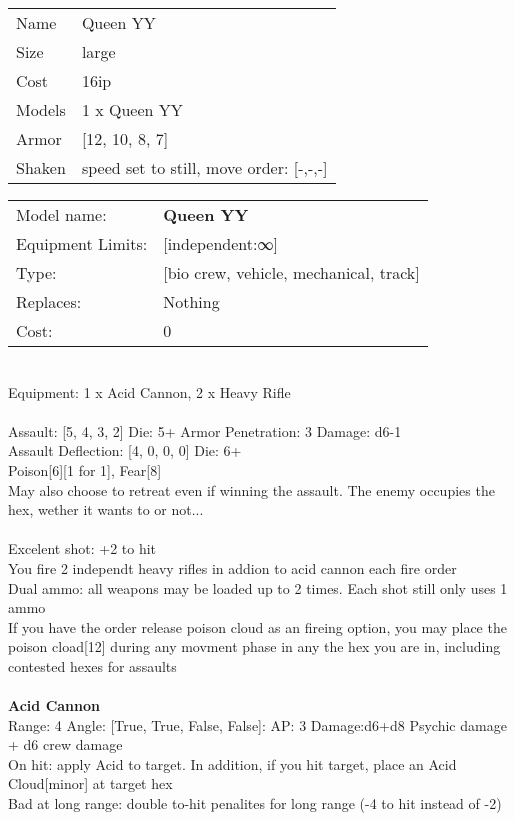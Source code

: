 \begin{tabular}{ll}
  Name & Queen YY \\
  Size & large\\
  Cost & 16ip\\
  Models & 1 x Queen YY\\
  Armor & [12, 10, 8, 7]\\
  Shaken & speed set to still, move order: [-,-,-]\\
\end{tabular}

\noindent 

\noindent
\begin{tabular}{ll}
Model name: &{\bf Queen YY } \\
Equipment Limits: &[independent:∞] \\
Type: &[bio crew, vehicle, mechanical, track] \\
Replaces: &Nothing \\
Cost: & 0\\
\end{tabular}
\ \\
Equipment: 1 x Acid Cannon, 2 x Heavy Rifle \\
\ \\
Assault: [5, 4, 3, 2] Die: 5+ Armor Penetration: 3 Damage: d6-1 \\
Assault Deflection: [4, 0, 0, 0] Die: 6+\\
\indent Poison[6][1 for 1], Fear[8]\\ 
May also choose to retreat even if winning the assault. The enemy occupies the hex, wether it wants to or not...\\ 
 
\ \\
Excelent shot: +2 to hit\\ 
You fire 2 independt heavy rifles in addion to acid cannon each fire order\\ 
Dual ammo: all weapons may be loaded up to 2 times. Each shot still only uses 1 ammo\\ 
If you have the order release poison cloud as an fireing option, you may place the poison cload[12] during any movment phase in any the hex you are in, including contested hexes for assaults\\ 

\ \\
{\bf Acid Cannon } \\



Range: 4  Angle: [True, True, False, False]: AP: 3 Damage:d6+d8 Psychic damage + d6 crew damage \\
On hit: apply Acid to target. In addition, if you hit target, place an Acid Cloud[minor] at target hex\\ 
Bad at long range: double to-hit penalites for long range (-4 to hit instead of -2)\\ 




